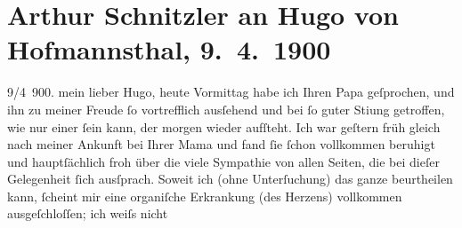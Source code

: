 

         
         \newcommand{\erwaehntePersonen}{Personen: Richard Beer-Hofmann, Georg Hirschfeld, Hugo von Hofmannsthal, Hugo August von Hofmannsthal, Anna von Hofmannsthal, Elly Petersen, Marie Reinhard, Hans Schandlbauer}
         \newcommand{\erwaehnteInstitutionen}{}
         \newcommand{\erwaehnteOrte}{Orte: Dalmatien, Dubrovnik, Opatija, Paris, Wien}
         \newcommand{\erwaehnteWerke}{Werke: Ein Erfolg, Frau Bertha Garlan. Roman, Im Spiel der Sommerlüfte. In drei Aufzügen, Tagebuch}
               \section[Arthur Schnitzler an Hugo von Hofmannsthal, 9. 4. 1900]{ Arthur Schnitzler an Hugo von Hofmannsthal, 9. 4. 1900}\nopagebreak{}\rehead{ }\begin{ledgroupsized}[t]{13cm}\normalsize\beginnumbering \toendnotes[C]{\smallbreak\pagebreak[2]} 
\toendnotes[C]{\smallbreak}\pstart
           \raggedleft{}{\pb}9/4 900. \pend
           \pstart
           mein lieber Hugo, heute Vormittag habe ich Ihren Papa geſprochen, und ihn zu meiner Freude ſo
               vortrefflich ausſehend und bei ſo guter Sti{\geminationm}ung
               getroffen, wie nur einer ſein kann, der morgen wieder aufſteht. Ich war geſtern
                  früh gleich nach meiner Ankunft bei Ihrer Mama und fand ſie ſchon vollkommen beruhigt
               und hauptſächlich froh über die viele Sympathie von allen Seiten, die bei dieſer
               Gelegenheit ſich ausſprach. {\pb}Soweit ich (ohne
               Unterſuchung) das ganze beurtheilen kann, ſcheint mir eine organiſche Erkrankung \introOben{}(des Herzens)\introOben{} vollkommen ausgeſchloſſen; ich weiſs nicht

\end{ledgroupsized}
